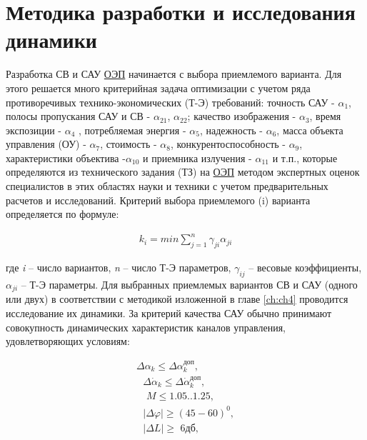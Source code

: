 \section{Методика разработки и исследования динамики} \label{sec:ch2/sec1-}


Разработка СВ и САУ \hyperref[acroEOS]{ОЭП} начинается с выбора приемлемого варианта. Для этого решается много критерийная задача оптимизации с учетом ряда противоречивых технико-экономических (Т-Э) требований: точность САУ -  $\alpha_{1}$, полосы пропускания САУ и СВ - $\alpha_{21}$, $\alpha_{22}$; качество изображения -  $\alpha_{3}$, время экспозиции -  $\alpha_{4}$ , потребляемая энергия -  $\alpha_{5}$, надежность -  $\alpha_{6}$, масса объекта управления (ОУ) -  $\alpha_{7}$, стоимость -  $\alpha_{8}$, конкурентоспособность - $\alpha_{9}$, характеристики объектива -$\alpha_{10}$ и приемника излучения - $\alpha_{11}$ и т.п., которые определяются из технического задания (ТЗ) на \hyperref[acroEOS]{ОЭП} методом экспертных оценок специалистов в этих областях науки и техники с учетом предварительных расчетов и исследований. Критерий выбора приемлемого (i) варианта определяется по формуле:

\begin{equation}
\label{eq:p2:1}
\begin{alignedat}{2}
k_i=min\sum_{j=1}^n{\gamma _{ji}\alpha _{ji}}
\end{alignedat}
\end{equation}

где \textit{i} – число вариантов, \textit{n} – число Т-Э параметров, $\gamma_{ij}$ – весовые коэффициенты, $\alpha_{ji}$ – Т-Э параметры. Для выбранных приемлемых вариантов  СВ и САУ (одного или двух) в соответствии с методикой изложенной в главе \ref{ch:ch4} проводится исследование их динамики. За критерий качества САУ обычно принимают совокупность динамических характеристик каналов управления, удовлетворяющих условиям:

\begin{equation}
\label{eq:p2:2}
\begin{alignedat}{2}
\varDelta \alpha _k\leqslant \varDelta \alpha _{k}^{\textit{доп}},
\\
\,\,\,\,\varDelta \dot{\alpha}_k\leqslant \varDelta \dot{\alpha}_{k}^{\textit{доп}},
\\
\,\,\,\,\,\,M\leqslant \text{1.05..1.25,}
\\
\,\,\,\,\left| \left. \varDelta \varphi \right| \right. \geqslant \left( 45-60 \right) ^0,
\\
\,\,\,\,\left| \left. \varDelta L \right|\geqslant \,\,\textit{6дб}, \right. 
\end{alignedat}
\end{equation}

